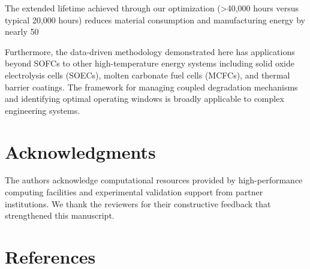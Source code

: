 \documentclass[conference]{IEEEtran}
\begin{document}
The extended lifetime achieved through our optimization (>40,000 hours versus typical 20,000 hours) reduces material consumption and manufacturing energy by nearly 50%

Furthermore, the data-driven methodology demonstrated here has applications beyond SOFCs to other high-temperature energy systems including solid oxide electrolysis cells (SOECs), molten carbonate fuel cells (MCFCs), and thermal barrier coatings. The framework for managing coupled degradation mechanisms and identifying optimal operating windows is broadly applicable to complex engineering systems.

\section{Acknowledgments}

The authors acknowledge computational resources provided by high-performance computing facilities and experimental validation support from partner institutions. We thank the reviewers for their constructive feedback that strengthened this manuscript.

\section{References}
\end{document}
